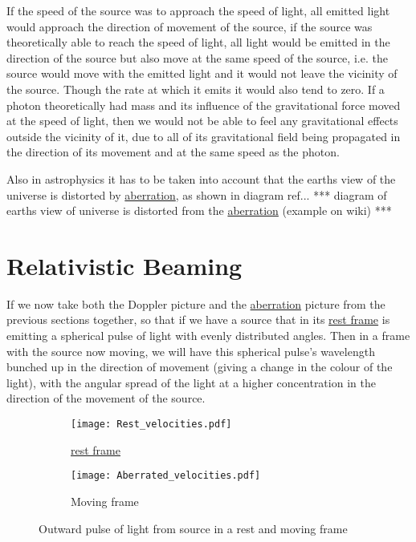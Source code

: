 If the speed of the source was to approach the speed of light, all emitted light would approach the direction of movement of the source, if the source was theoretically able to reach the speed of light, all light would be emitted in the direction of the source but also move at the same speed of the source, i.e. the source would move with the emitted light and it would not leave the vicinity of the source. Though the rate at which it emits it would also tend to zero. If a photon theoretically had mass and its influence of the gravitational force moved at the speed of light, then we would not be able to feel any gravitational effects outside the vicinity of it, due to all of its gravitational field being propagated in the direction of its movement and at the same speed as the photon.


Also in astrophysics it has to be taken into account that the earths view of the universe is distorted by \hyperlink{def-aberration}{aberration}, as shown in diagram ref{...} *** diagram of earths view of universe is distorted from the \hyperlink{def-aberration}{aberration} (example on wiki) ***

\section{Relativistic Beaming}

If we now take both the Doppler picture and the \hyperlink{def-aberration}{aberration} picture from the previous sections together, so that if we have a source that in its \hyperlink{def-proper-frame}{rest frame} is emitting a spherical pulse of light with evenly distributed angles. Then in a frame with the source now moving, we will have this spherical pulse's wavelength bunched up in the direction of movement (giving a change in the colour of the light), with the angular spread of the light at a higher concentration in the direction of the movement of the source.


\begin{figure}[htbp]
\begin{subfigure}{.49\textwidth}
\centering
       \texttt{[image: Rest\_velocities.pdf]}
    \caption{\hyperlink{def-proper-frame}{rest frame}}
\end{subfigure}
\begin{subfigure}{.49\textwidth}
\centering
       \texttt{[image: Aberrated\_velocities.pdf]}
    \caption{Moving frame}
\end{subfigure}
\caption{Outward pulse of light from source in a rest and moving frame}
\label{fig: outward pulse velocities}
\end{figure}

